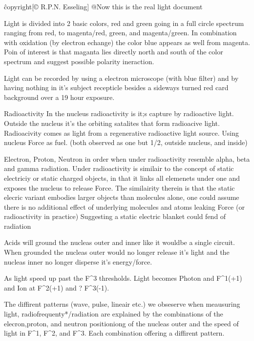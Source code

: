 \^copyright{[© R.P.N. Esseling]}
@Now this is the real light document

Light is divided into 2 basic colors, red and green going in a full circle spectrum ranging from red, to magenta/red, green, and magenta/green.
In combination with oxidation (by electron echange) the color blue appears as well from magenta. 
Poin of interest is that maganta lies directly north and south of the color spectrum and suggest possible polarity ineraction.

Light can be recorded by using a electron microscope (with blue filter) and by having nothing in it's subject recepticle besides a sideways turned red card background over a 19 hour exposure.

Radioactivity
In the nucleus radioactivity is it;s capture by radioactive light.
Outside the nucleus it's the orbiting satalites that form radioacive light. 
Radioacivity comes as light from a regenerative radioactive light source. Using nucleus Force as fuel.
(both observed as one but 1/2, outside nucleus, and inside)

Electron, Proton, Neutron in order when under radioactivity resemble alpha, beta and gamma radiation.
Under radioactivity is similair to the concept of static electriciy or static charged objects, in that it links all elemenets under one and exposes the nucleus to release Force.
The similairity therein is that the static elecric variant embodies larger objects than molecules alone, one could assume there is  no additional effect of underlying molecules and atoms leaking Force (or radioactivity in practice)
Suggesting a static electric blanket could fend of radiation

Acids will ground the nucleas outer and inner like it wouldbe a single circuit. When grounded the nucleas outer would no longer release it's light and the nucleas inner no longer disperse it's energy/force.

As light speed up past the F^3 thresholds. Light becomes Photon and F^1(+1) and Ion at F^2(+1) and ? F^3(-1). 

The diffirent patterns (wave, pulse, lineair etc.) we obseserve when meausuring light, radiofrequenty*/radiation are explained by the combinations of the elecron,proton, 
and neutron positioniong of the nucleas outer and the speed of light in F^1, F^2, and F^3. Each combination offering a diffirent pattern.

